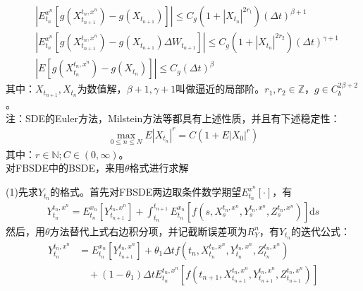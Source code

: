 						\begin{align*}
			 		&\left| {E_{{t_n}}^{{x^n}}\left[ {g\left( {X_{{t_{n + 1}}}^{{t_n},{x^n}}} \right) - g\left( {{X_{{t_{n + 1}}}}} \right)} \right]} \right| \leqslant {C_g}\left( {1 + {{\left| {{X_{{t_n}}}} \right|}^{2{r_1}}}} \right){\left( {\Delta t} \right)^{\beta  + 1}}\\
			 		&\left| {E_{{t_n}}^{{x^n}}\left[ {g\left( {X_{{t_{n + 1}}}^{{t_n},{x^n}}} \right) - g\left( {{X_{{t_{n + 1}}}}} \right)\Delta {W_{{t_{n + 1}}}}} \right]} \right| \leqslant {C_g}\left( {1 + {{\left| {{X_{{t_n}}}} \right|}^{2{r_2}}}} \right){\left( {\Delta t} \right)^{\gamma  + 1}}\\
			 		&\left| {E\left[ {g\left( {X_{{t_n}}^{{t_n},{x^n}}} \right) - g\left( {{X_{{t_n}}}} \right)} \right]} \right| \leqslant {C_g}{\left( {\Delta t} \right)^\beta }
			 		\end{align*}
			 其中：$X_{t_{n+1}},X_{t_{n}}$为数值解，$\beta+1,\gamma+1$叫做逼近的局部阶。$r_1,r_2 \in \mathbb{Z}$，$g \in C_b^{2\beta+2}$。\\
			 注：SDE的Euler方法，Milstein方法等都具有上述性质，并且有下述稳定性：
			 \begin{align*}
			 \mathop {\max }\limits_{0 \leqslant n \leqslant {N }} E{\left| {{X_{{t_n}}}} \right|^r} = C\left( {1 + E{{\left| {{X_0}} \right|}^r}} \right)\end{align*}
			 其中：$r \in \mathbb{N};C \in (0,\infty)$。\\
			 \checkmark 对FBSDE中的BSDE，来用$\theta$格式进行求解
			 \par
			 (1)先求$Y_{t_n}$的格式。首先对FBSDE两边取条件数学期望$E_{t_n}^{x^n}[\cdot]$，有
			 \begin{align*}
			Y_{{t_n}}^{{t_n},{x^n}} = E_{{t_n}}^{{x_n}}\left[Y_{{t_{n+1}}}^{{t_n},{x^n}}\right] + \int_{t_n}^{t_{n+1}}E_{t_n}^{x_n}\left[ f(s,X_s^{t_n,x^n},Y_s^{t_n,x^n},Z_s^{t_n,x^n}) \right]\mathrm{d}s
			 \end{align*}
			 然后，用$\theta$方法替代上式右边积分项，并记截断误差项为$R_Y^n$，有$Y_{t_n}$的迭代公式：
			 \begin{align*}
			 	Y_{t_n}^{t_n,x^n} &= E_{t_n}^{x_n}\left[Y_{{t_{n+1}}}^{{t_n},{x^n}}\right] + {\theta _1}\Delta tf\left( {t_n},X_{{t_n}}^{{t_n},{x^n}},Y_{{t_n}}^{{t_n},{x^n}},Z_{{t_n}}^{{t_n},{x^n}} \right)\\
					& \quad + \left( {1 - {\theta _1}} \right)\Delta tE_{{t_n}}^{{t_n},{x^n}}\left[ f\left( {t_{n + 1}},X_{{t_{n + 1}}}^{{t_n},{x^n}},Y_{{t_{n + 1}}}^{{t_n},{x^n}},Z_{{t_{n + 1}}}^{{t_n},{x^n}} \right) \right]
			 \end{align*}
